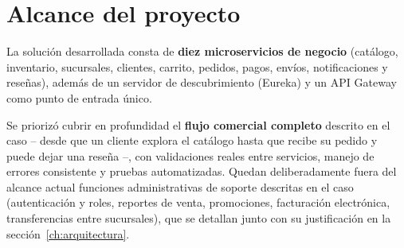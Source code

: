 \section{Alcance del proyecto}

La solución desarrollada consta de \textbf{diez microservicios de negocio}
(catálogo, inventario, sucursales, clientes, carrito, pedidos, pagos, envíos,
notificaciones y reseñas), además de un servidor de descubrimiento (Eureka) y un API
Gateway como punto de entrada único.

Se priorizó cubrir en profundidad el \textbf{flujo comercial completo} descrito en el
caso -- desde que un cliente explora el catálogo hasta que recibe su pedido y puede
dejar una reseña --, con validaciones reales entre servicios, manejo de errores
consistente y pruebas automatizadas. Quedan deliberadamente fuera del alcance actual
funciones administrativas de soporte descritas en el caso (autenticación y roles,
reportes de venta, promociones, facturación electrónica, transferencias entre
sucursales), que se detallan junto con su justificación en la
sección~\ref{ch:arquitectura}.
